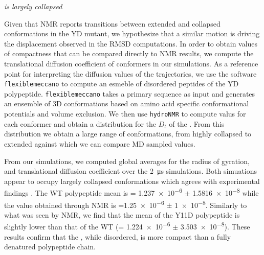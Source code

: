 \begin{figure}
	\centering     %
\end{figure}
	
{\it \gct is largely collapsed}

Given that NMR reports transitions between extended and collapsed conformations in the YD mutant, we hypothesize that a similar motion is driving the displacement observed in the RMSD computations. In order to obtain values of compactness that can be compared directly to NMR results, we compute the translational diffusion coefficient of conformers in our simulations. As a reference point for interpreting the diffusion values of the trajectories, we use the software \texttt{flexiblemeccano} to compute an esmeble of disordered peptides of the YD polypeptide. \texttt{flexiblemeccano} takes a primary sequence as input and generates an ensemble of 3D conformations based on amino acid specific conformational potentials and volume exclusion. We then use \texttt{hydroNMR} to compute \diffusion valus for each conformer and obtain a distribution for the $D_t$ of the \gct. From this distribution  we obtain a large range of conformations, from highly collapsed to extended against which we can compare MD sampled values.

From our simulations, we computed global averages for the radius of gyration, and translational diffusion coefficient over the \SI{2}{\us} simulations. Both simuations appear to occupy largely collapsed conformations which agrees with experimental findings . The WT polypeptide \diffusion mean is \diffusion = \num{1.237e-6} $\pm$ \SI{1.5816e-8}{\dcunits} while the value obtained through NMR is  \diffusion=\num{1.25e-6} $\pm$  \SI{1e-8}{\dcunits}. Similarly to what was seen by NMR, we find that the mean \diffusion of the Y11D \gct polypeptide is slightly lower than that of the WT \gct (\diffusion= \num{1.224e-6} $\pm$ \SI{3.503e-8}{\dcunits}). These results confirm that the \gct, while disordered, is more compact than a fully denatured polypeptide chain.




\begin{figure}
	\centering     %
	\label{fig:fm}
\end{figure}

